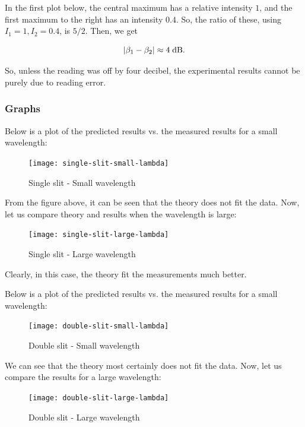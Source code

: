 \documentclass{paper}
\begin{document}
In the first plot below, the central maximum has a relative intensity $1$, and the first maximum to the right has an intensity $0.4$. So, the ratio of these, using $I_1 = 1, I_2 = 0.4$, is
$5/2$. Then, we get

\begin{equation*}
    \lvert \beta_1 - \beta_2 \rvert \approx 4 \; \textnormal{dB}.
\end{equation*}

So, unless the reading was off by four decibel, the experimental results cannot be purely due to reading error.


\subsubsection{Graphs}
Below is a plot of the predicted results vs. the measured results for a small wavelength:

\begin{figure}[H]
\label{fig:single-slit-small-lambda}
\caption{Single slit - Small wavelength}    
    \texttt{[image: single-slit-small-lambda]}

\end{figure}
From the figure above, it can be seen that the theory does not fit the data.
Now, let us compare theory and results when the wavelength is large:

\begin{figure}[H]
\label{fig:single-slit-large-lambda}
\caption{Single slit - Large wavelength}
    \texttt{[image: single-slit-large-lambda]}
\end{figure} 

Clearly, in this case, the theory fit the measurements much better.

Below is a plot of the predicted results vs. the measured results for a small wavelength:

\begin{figure}[H]
\label{fig:double-slit-small-lambda}
\caption{Double slit - Small wavelength}
    \texttt{[image: double-slit-small-lambda]}
\end{figure}

We can see that the theory most certainly does not fit the data.
Now, let us compare the results for a large wavelength:

\begin{figure}[H]
\label{fig:double-slit-large-lambda}
\caption{Double slit - Large wavelength}
    \texttt{[image: double-slit-large-lambda]}
\end{figure}
\end{document}
